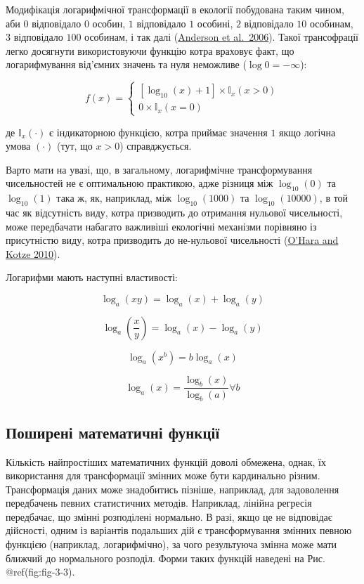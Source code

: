 \documentclass[
  11pt,
]{book}
\begin{document}
Модифікація логарифмічної трансформації в екології побудована таким
чином, аби \(0\) відповідало \(0\) особин, \(1\) відповідало \(1\)
особині, \(2\) відповідало \(10\) особинам, \(3\) відповідало \(100\)
особинам, і так далі
(\href{https://doi.org/10.1111/j.1461-0248.2006.00926.x}{Anderson et
al.~2006}). Такої трансофрації легко досягнути використовуючи функцію
котра враховує факт, що логарифмування від'ємних значень та нуля
неможливе (\(\log0 = -\infty\)):

\[f(x) = \begin{cases}
[\log_{10}(x)+1] \times \mathbb{I}_x(x > 0)\\
0 \times \mathbb{I}_x(x = 0)
\end{cases}\]

де \(\mathbb{I}_x(\cdot)\) є індикаторною функцією, котра приймає
значення \(1\) якщо логічна умова \((\cdot)\) (тут, що \(x > 0\))
справджується.

Варто мати на увазі, що, в загальному, логарифмічне трансформування
чисельностей не є оптимальною практикою, адже різниця між
\(\log_{10}(0)\) та \(\log_{10}(1)\) така ж, як, наприклад, між
\(\log_{10}(1000)\) та \(\log_{10}(10000)\), в той час як відсутність
виду, котра призводить до отримання нульової чисельності, може
передбачати набагато важливіші екологічні механізми порівняно із
присутністю виду, котра призводить до не-нульової чисельності
(\href{https://doi.org/10.1111/j.2041-210X.2010.00021.x}{O'Hara and
Kotze 2010}).

Логарифми мають наступні властивості:

\[\log_a(xy) = \log_a(x) + \log_a(y)\]

\[\log_a(\frac{x}{y}) = \log_a(x) - \log_a(y)\]

\[\log_a(x^b) = b \log_a (x)\]

\[\log_a(x) = \frac{\log_b (x)}{\log_b (a)} \forall b\]

\subsection{Поширені математичні
функції}\label{ux43fux43eux448ux438ux440ux435ux43dux456-ux43cux430ux442ux435ux43cux430ux442ux438ux447ux43dux456-ux444ux443ux43dux43aux446ux456ux457}

Кількість найпростіших математичних функцій доволі обмежена, однак, їх
використання для трансформації змінних може бути кардинально різним.
Трансформація даних може знадобитись пізніше, наприклад, для задоволення
передбачень певних статистичних методів. Наприклад, лінійна регресія
передбачає, що змінні розподілені нормально. В разі, якщо це не
відповідає дійсності, одним із варіантів подальших дій є трансформування
змінних певною функцією (наприклад, логарифмічно), за чого результуюча
змінна може мати ближчий до нормального розподіл. Форми таких функцій
наведені на Рис. @ref(fig:fig-3-3).
\end{document}
